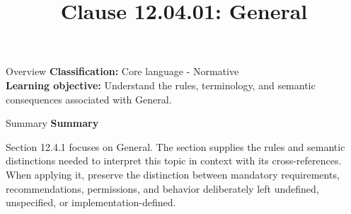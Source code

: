 \documentclass[10pt,letterpaper]{article}
\title{Clause 12.04.01: General}
\author{}
\date{}
\begin{document}
\maketitle
\begin{CornellOverviewBox}{Overview}
\textbf{Classification:} Core language - Normative\\[2pt]
\textbf{Learning objective:} Understand the rules, terminology, and semantic consequences associated with General.
\end{CornellOverviewBox}\begin{CornellSummaryBox}{Summary}
{\sffamily\bfseries\color{Accent} Summary}\par\vspace{3pt}Section 12.4.1 focuses on General. The section supplies the rules and semantic distinctions needed to interpret this topic in context with its cross-references. When applying it, preserve the distinction between mandatory requirements, recommendations, permissions, and behavior deliberately left undefined, unspecified, or implementation-defined.
\end{CornellSummaryBox}
\end{document}
